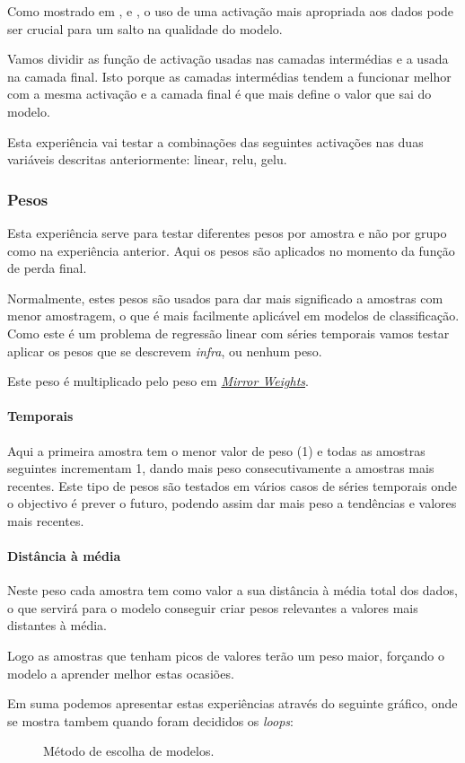 Como mostrado em \cite{Vaswani2017}, e \cite{Liu2022}, o uso de uma activação mais apropriada aos dados pode ser crucial para um salto na qualidade do modelo.\par
Vamos dividir as função de activação usadas nas camadas intermédias e a usada na camada final. Isto porque as camadas intermédias tendem a funcionar melhor com a mesma activação e a camada final é que mais define o valor que sai do modelo.\par
Esta experiência vai testar a combinações das seguintes activações nas duas variáveis descritas anteriormente: linear, relu, gelu.\par


\subsubsection{Pesos}

Esta experiência serve para testar diferentes pesos por amostra e não por grupo como na experiência anterior. Aqui os pesos são aplicados no momento da função de perda final.\par
Normalmente, estes pesos são usados para dar mais significado a amostras com menor amostragem, o que é mais facilmente aplicável em modelos de classificação. Como este é um problema de regressão linear com séries temporais vamos testar aplicar os pesos que se descrevem \textit{infra}, ou nenhum peso.\par
Este peso é multiplicado pelo peso em \hyperref[se:advancedloss]{\textit{Mirror Weights}}.


\paragraph{Temporais}
\text{ }  \par
Aqui a primeira amostra tem o menor valor de peso (1) e todas as amostras seguintes incrementam 1, dando mais peso consecutivamente a amostras mais recentes. Este tipo de pesos são testados em vários casos de séries temporais onde o objectivo é prever o futuro, podendo assim dar mais peso a tendências e valores mais recentes.\par

\paragraph{Distância à média}
\text{ }  \par
Neste peso cada amostra tem como valor a sua distância à média total dos dados, o que servirá para o modelo conseguir criar pesos relevantes a valores mais distantes à média.\par
Logo as amostras que tenham picos de valores terão um peso maior, forçando o modelo a aprender melhor estas ocasiões.

\bigskip
Em suma podemos apresentar estas experiências através do seguinte gráfico, onde se mostra tambem quando foram decididos os \textit{loops}:
\begin{figure}[H]
	\centering
	\resizebox{\linewidth}{!}{}
	\caption{Método de escolha de modelos.}
	\label{fig:method_training}
\end{figure}
